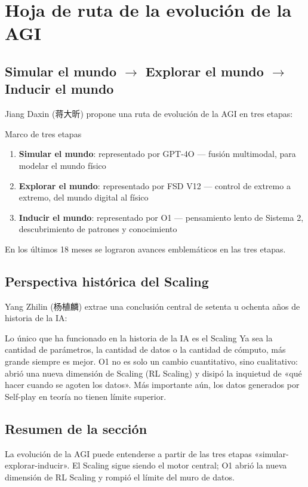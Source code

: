 \section{Hoja de ruta de la evolución de la AGI}

\subsection{Simular el mundo $\rightarrow$ Explorar el mundo $\rightarrow$ Inducir el mundo}

Jiang Daxin (蒋大昕) propone una ruta de evolución de la AGI en tres etapas:

\begin{knowledgebox}{Marco de tres etapas}
\begin{enumerate}
\item \textbf{Simular el mundo}: representado por GPT-4O — fusión multimodal, para modelar el mundo físico
\item \textbf{Explorar el mundo}: representado por FSD V12 — control de extremo a extremo, del mundo digital al físico
\item \textbf{Inducir el mundo}: representado por O1 — pensamiento lento de Sistema 2, descubrimiento de patrones y conocimiento
\end{enumerate}
En los últimos 18 meses se lograron avances emblemáticos en las tres etapas.
\end{knowledgebox}

\subsection{Perspectiva histórica del Scaling}

Yang Zhilin (杨植麟) extrae una conclusión central de setenta u ochenta años de historia de la IA:

\begin{importantbox}{Lo único que ha funcionado en la historia de la IA es el Scaling}
Ya sea la cantidad de parámetros, la cantidad de datos o la cantidad de cómputo, más grande siempre es mejor. O1 no es solo un cambio cuantitativo, sino cualitativo: abrió una nueva dimensión de Scaling (RL Scaling) y disipó la inquietud de «qué hacer cuando se agoten los datos». Más importante aún, los datos generados por Self-play en teoría no tienen límite superior.
\end{importantbox}

\subsection{Resumen de la sección}

La evolución de la AGI puede entenderse a partir de las tres etapas «simular-explorar-inducir». El Scaling sigue siendo el motor central; O1 abrió la nueva dimensión de RL Scaling y rompió el límite del muro de datos.


